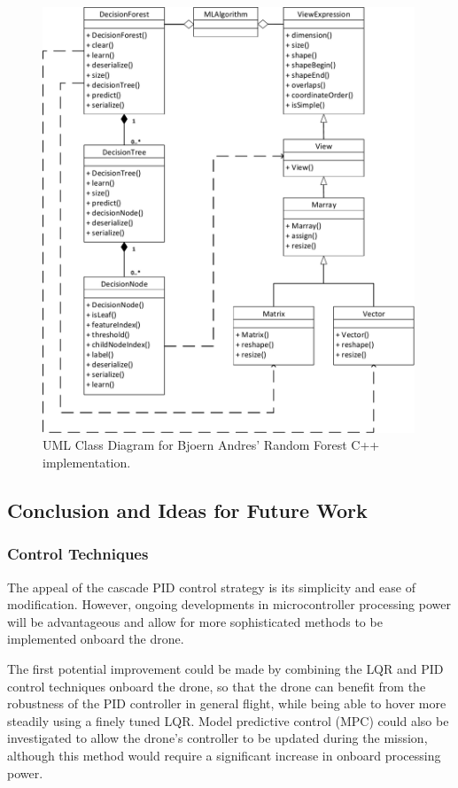 \begin{figure}[H]
\centering
\includegraphics[width=0.99\textwidth]{figs/Samuel/Figures/UML Random Forest-cropped.pdf}
\caption{UML Class Diagram for Bjoern Andres' Random Forest C++ implementation.}
\label{fig:uml}
\end{figure}




\subsection{Conclusion and Ideas for Future Work}

\subsubsection{Control Techniques}
\label{sec:modelfree}

The appeal of the cascade \gls{PID} control strategy is its simplicity and ease of modification. However, ongoing developments in microcontroller processing power will be advantageous and allow for more sophisticated methods to be implemented onboard the drone.

The first potential improvement could be made by combining the \gls{LQR} and \gls{PID} control techniques onboard the drone, so that the drone can benefit from the robustness of the \gls{PID} controller in general flight, while being able to hover more steadily using a finely tuned \gls{LQR}. Model predictive control (\acrshort{MPC}) could also be investigated to allow the drone's controller to be updated during the mission, although this method would require a significant increase in onboard processing power. 

